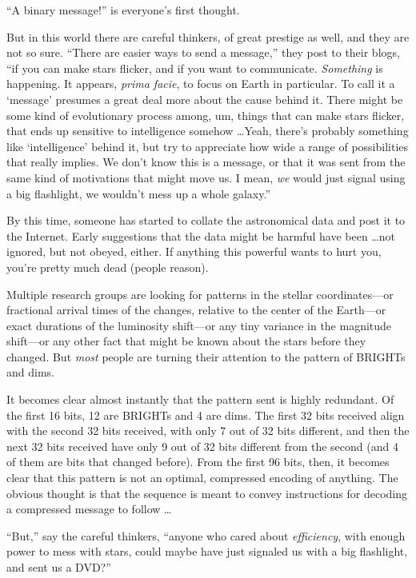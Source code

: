 {
 ``A binary message!'' is
everyone's first thought.}

{
 But in this world there are careful thinkers, of great prestige as
well, and they are not so sure. ``There are easier
ways to send a message,'' they post to their blogs,
``if you can make stars flicker, and if you want to
communicate. \textit{Something} is happening. It appears, \textit{prima
facie}, to focus on Earth in particular. To call it a
`message' presumes a great deal more
about the cause behind it. There might be some kind of evolutionary
process among, um, things that can make stars flicker, that ends up
sensitive to intelligence somehow \ldots Yeah, there's
probably something like `intelligence'
behind it, but try to appreciate how wide a range of possibilities that
really implies. We don't know this is a message, or
that it was sent from the same kind of motivations that might move us.
I mean, \textit{we} would just signal using a big flashlight, we
wouldn't mess up a whole galaxy.''}

{
 By this time, someone has started to collate the astronomical data
and post it to the Internet. Early suggestions that the data might be
harmful have been \ldots not ignored, but not obeyed, either. If
anything this powerful wants to hurt you, you're pretty
much dead (people reason).}

{
 Multiple research groups are looking for patterns in the stellar
coordinates---or fractional arrival times of the changes, relative to
the center of the Earth---or exact durations of the luminosity
shift---or any tiny variance in the magnitude shift---or any other fact
that might be known about the stars before they changed. But
\textit{most} people are turning their attention to the pattern of
BRIGHTs and dims.}

{
 It becomes clear almost instantly that the pattern sent is highly
redundant. Of the first 16 bits, 12 are BRIGHTs and 4 are dims. The
first 32 bits received align with the second 32 bits received, with
only 7 out of 32 bits different, and then the next 32 bits received
have only 9 out of 32 bits different from the second (and 4 of them are
bits that changed before). From the first 96 bits, then, it becomes
clear that this pattern is not an optimal, compressed encoding of
anything. The obvious thought is that the sequence is meant to convey
instructions for decoding a compressed message to follow \ldots}

{
 ``But,'' say the careful
thinkers, ``anyone who cared about
\textit{efficiency}, with enough power to mess with stars, could maybe
have just signaled us with a big flashlight, and sent us a
DVD?''}

